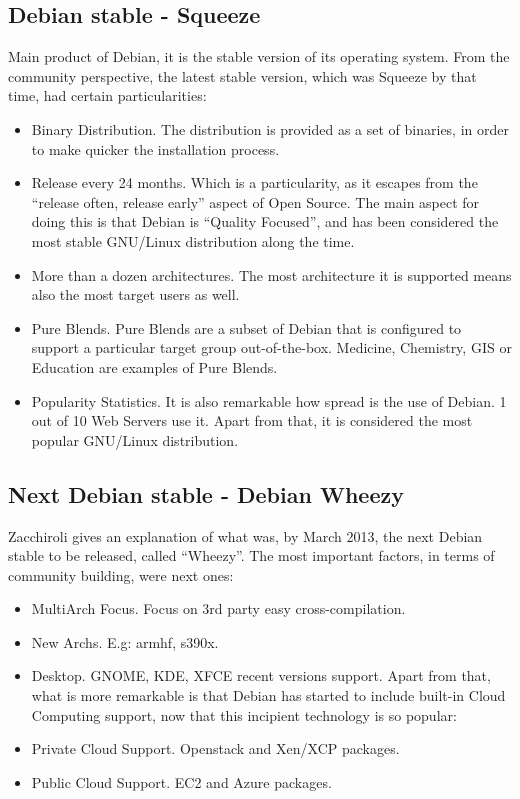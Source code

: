 \documentclass[11pt]{article}
\begin{document}
\subsection{Debian stable - Squeeze}
Main product of Debian, it is the stable version of its operating system. From the community perspective, the latest stable version, which was Squeeze by that time, had certain particularities:
\begin{itemize}\itemsep0pt
\item{Binary Distribution}. The distribution is provided as a set of binaries, in order to make quicker the installation process.
\item{Release every 24 months}. Which is a particularity, as it escapes from the ``release often, release early'' aspect of Open Source. The main aspect for doing this is that Debian is ``Quality Focused'', and has been considered the most stable GNU/Linux distribution along the time.
\item{More than a dozen architectures}. The most architecture it is supported means also the most target users as well.
\item{Pure Blends}. Pure Blends are a subset of Debian that is configured to support a particular target group out-of-the-box. Medicine, Chemistry, GIS or Education are examples of Pure Blends.
\item{Popularity Statistics}. It is also remarkable how spread is the use of Debian. 1 out of 10 Web Servers use it. Apart from that, it is considered the most popular GNU/Linux distribution.
\end{itemize}

\subsection{Next Debian stable - Debian Wheezy}
Zacchiroli gives an explanation of what was, by March 2013, the next Debian stable to be released, called ``Wheezy''. The most important factors, in terms of community building, were next ones:
\begin{itemize}\itemsep0pt
\item{MultiArch Focus}. Focus on 3rd party easy cross-compilation.
\item{New Archs}. E.g: armhf, s390x.
\item{Desktop}. GNOME, KDE, XFCE recent versions support.
Apart from that, what is more remarkable is that Debian has started to include built-in Cloud Computing support, now that this incipient technology is so popular:
\item{Private Cloud Support}. Openstack and Xen/XCP packages.
\item{Public Cloud Support}. EC2 and Azure packages.
\end{itemize}
\end{document}
